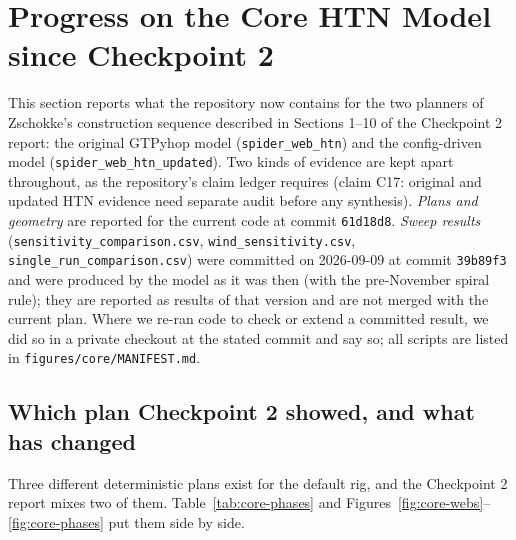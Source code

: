 \section{Progress on the Core HTN Model since Checkpoint 2}
\label{sec:core}

This section reports what the repository now contains for the two planners of Zschokke's \cite{zschokke1996early} construction sequence described in
Sections 1--10 of the Checkpoint 2 report: the original GTPyhop model (\texttt{spider\_web\_htn}) and the
config-driven model (\texttt{spider\_web\_htn\_updated}). Two kinds of evidence are kept apart throughout,
as the repository's claim ledger requires (claim C17: original and updated HTN evidence need separate
audit before any synthesis). \emph{Plans and geometry} are reported for the current code at commit
\texttt{61d18d8}. \emph{Sweep results} (\texttt{sensitivity\_comparison.csv},
\texttt{wind\_sensitivity.csv}, \texttt{single\_run\_comparison.csv}) were committed on 2026-09-09 at
commit \texttt{39b89f3} and were produced by the model as it was then (with the pre-November spiral
rule); they are reported as results of that version and are not merged with the current plan. Where we
re-ran code to check or extend a committed result, we did so in a private checkout at the stated commit
and say so; all scripts are listed in \texttt{figures/core/MANIFEST.md}.

\subsection{Which plan Checkpoint 2 showed, and what has changed}
\label{sec:core-plans}

Three different deterministic plans exist for the default rig, and the Checkpoint 2 report mixes two of
them. Table~\ref{tab:core-phases} and Figures~\ref{fig:core-webs}--\ref{fig:core-phases} put them side
by side.

